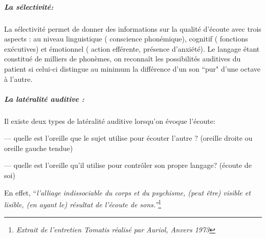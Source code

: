 \subparagraph{La sélectivité: }


La sélectivité permet de donner des informations sur la
qualité d'écoute avec trois aspects : au niveau linguistique ( conscience
phonémique), cognitif ( fonctions exécutives) et émotionnel ( action
efférente, présence d'anxiété).
Le langage étant constitué de milliers de phonèmes, on reconnaît les possibilités auditives du patient si celui-ci  distingue au minimum la différence d'un son ``pur" d'une octave à l'autre.  



\subparagraph{La latéralité auditive : }

Il existe deux types de latéralité auditive lorsqu'on évoque l'écoute:


--- quelle est l'oreille que le sujet utilise pour écouter l'autre ?
(oreille droite ou oreille gauche tendue)

--- quelle est l'oreille qu'il utilise pour contrôler son propre langage?
(écoute de soi)



En effet, ``\emph{l'alliage indissociable du corps et du psychisme, (peut être)
visible et lisible, (en ayant le) résultat de l'écoute de sons.''}\footnote{\emph{Extrait de l'entretien Tomatis réalisé par Auriol, Anvers 1973}}

